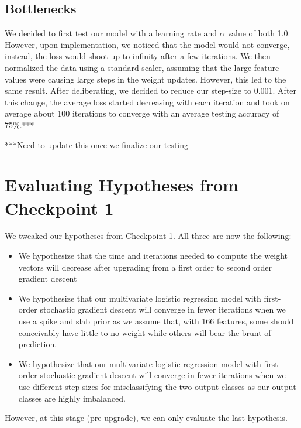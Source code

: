 \documentclass[12pt]{article}
\begin{document}
\subsection{Bottlenecks}

We decided to first test our model with a learning rate and $\alpha$ value of both 1.0. However, upon implementation, we noticed that the model would not converge, instead, the loss would shoot up to infinity after a few iterations. We then normalized the data using a standard scaler, assuming that the large feature values were causing large steps in the weight updates. However, this led to the same result. After deliberating, we decided to reduce our step-size to 0.001. After this change, the average loss started decreasing with each iteration and took on average about 100 iterations to converge with an average testing accuracy of 75\%.***

***Need to update this once we finalize our testing


\section{Evaluating Hypotheses from Checkpoint 1}

We tweaked our hypotheses from Checkpoint 1. All three are now the following:
\

\begin{itemize}
\item We hypothesize that the time and iterations needed to compute the weight vectors will decrease
after upgrading from a first order to second order gradient descent

\item We hypothesize that our multivariate logistic regression model with first-order stochastic gradient descent will converge in fewer iterations when we use a spike and slab prior as we assume that, with 166 features, some should conceivably have little to no weight while others will bear the brunt of prediction.

\item We hypothesize that our multivariate logistic regression model with first-order stochastic gradient descent will converge in fewer iterations when we use different step sizes for misclassifying the two output classes as our output classes are highly imbalanced.
\end{itemize}

However, at this stage (pre-upgrade), we can only evaluate the last hypothesis.
\end{document}
